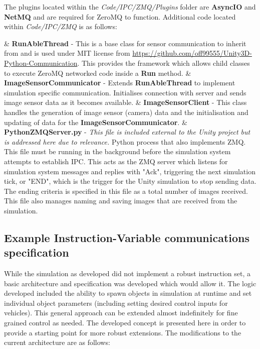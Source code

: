 \documentclass{article}
\begin{document}
The plugins located within the \textit{Code/IPC/ZMQ/Plugins} folder are \textbf{AsyncIO} and \textbf{NetMQ} and are required for ZeroMQ to function. Additional code located within \textit{Code/IPC/ZMQ} is as follows:

\begin{easylist}[itemize]
	& \textbf{RunAbleThread} - This is a base class for sensor communication to inherit from and is used under MIT license from \url{https://github.com/off99555/Unity3D-Python-Communication}. This provides the framework which allows child classes to execute ZeroMQ networked code inside a \textbf{Run} method.
	& \textbf{ImageSensorCommunicator} - Extends \textbf{RunAbleThread} to implement simulation specific communication. Initialises connection with server and sends image sensor data as it becomes available.
	& \textbf{ImageSensorClient} - This class handles the generation of image sensor (camera) data and the initialisation and updating of data for the \textbf{ImageSensorCommunicator}.
	& \textbf{PythonZMQServer.py} - \textit{This file is included external to the Unity project but is addressed here due to relevance.} Python process that also implements ZMQ. This file must be running in the background before the simulation system attempts to establish IPC. This acts as the ZMQ server which listens for simulation system messages and replies with "Ack", triggering the next simulation tick, or "END", which is the trigger for the Unity simulation to stop sending data. The ending criteria is specified in this file as a total number of images received. This file also manages naming and saving images that are received from the simulation. 
\end{easylist}



\subsection{Example Instruction-Variable communications specification}

While the simulation as developed did not implement a robust instruction set, a basic architecture and specification was developed which would allow it. The logic developed included the ability to spawn objects in simulation at runtime and set individual object parameters (including setting desired control inputs for vehicles). This general approach can be extended almost indefinitely for fine grained control as needed. The developed concept is presented here in order to provide a starting point for more robust extensions. The modifications to the current architecture are as follows:
\end{document}
